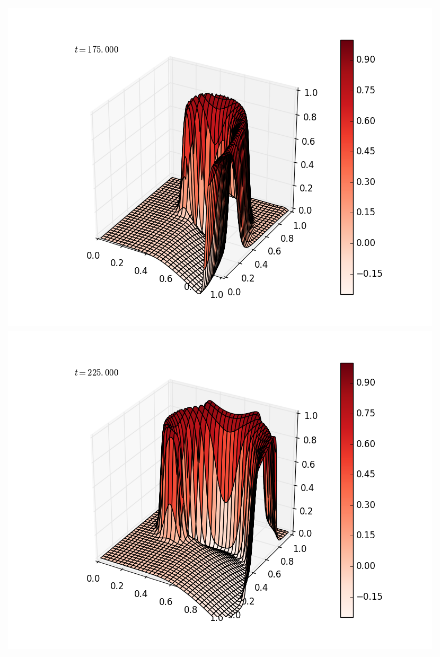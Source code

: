 \documentclass[12pt]{article}
\begin{document}
\begin{figure}[H]
\includegraphics[scale=0.4]{partc_fast_frames/partc_fast_fig09.png}
\includegraphics[scale=0.4]{partc_fast_frames/partc_fast_fig11.png}
\end{figure}
\end{document}
